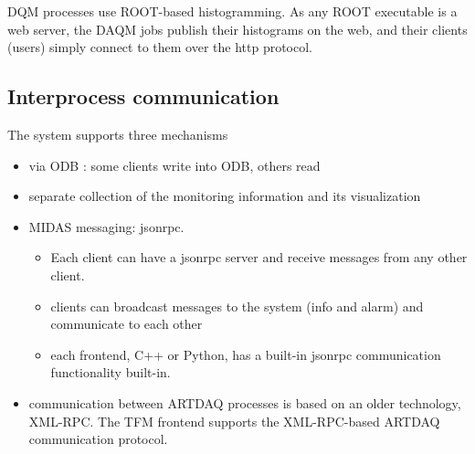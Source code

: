 DQM processes use ROOT-based histogramming. As any ROOT executable is a web server,
the DAQM jobs publish their histograms on the web, and their clients (users)
simply connect to them over the http protocol.

\subsection{Interprocess communication} 

The system supports three mechanisms
\begin{itemize}
\item
  via ODB : some clients write into ODB, others read
\item
  separate collection of the monitoring information and its visualization
\item
  MIDAS messaging: jsonrpc.
  \begin{itemize}
  \item
    Each client can have a jsonrpc server and receive messages
    from any other client.
  \item
    clients can broadcast messages to the system (info and alarm)
    and communicate to each other
  \item
    each frontend, C++ or Python, has a built-in jsonrpc communication
    functionality built-in.
  \end{itemize}
\item
  communication between ARTDAQ processes is based on an older technology,
  XML-RPC. The TFM frontend supports the XML-RPC-based ARTDAQ communication
  protocol.
\end{itemize}
